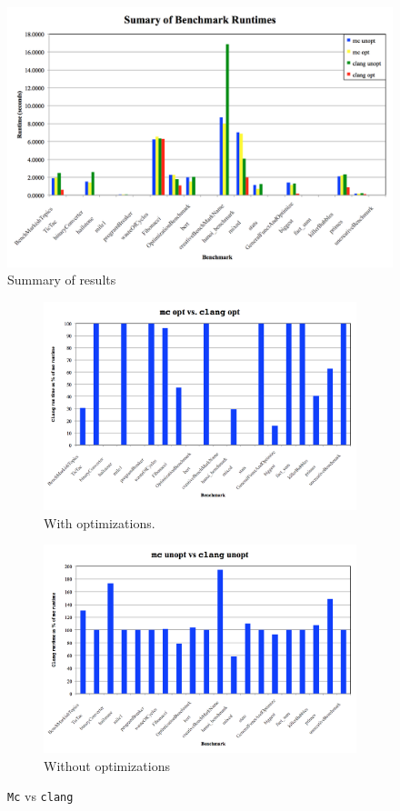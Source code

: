 \documentclass[12pt]{article}
\begin{document}
\begin{figure}[ht!]
  \centering
  \includegraphics[width=\textwidth]{summary.png}
  \caption{Summary of results}
  \label{fig:summary}
\end{figure}

\begin{figure}
\centering
\begin{subfigure}{.5\textwidth}
  \centering
  \includegraphics[width=.95\linewidth]{opt.png}
  \caption{With optimizations.}
  \label{fig:opt}
\end{subfigure}%
\begin{subfigure}{.5\textwidth}
  \centering
  \includegraphics[width=.95\linewidth]{unopt.png}
  \caption{Without optimizations}
  \label{fig:unopt}
\end{subfigure}
\caption{\texttt{Mc} vs \texttt{clang}}
\label{fig:vs}
\end{figure}
\end{document}
